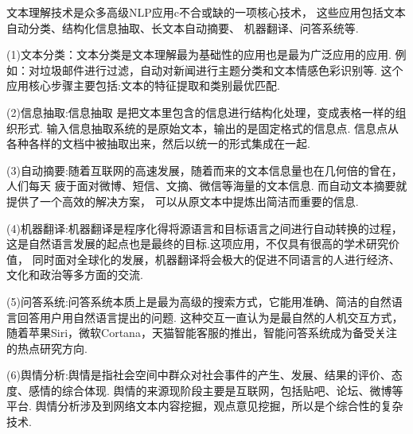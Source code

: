 \documentclass[bachelor,adobefonts]{jnuthesis}
\begin{document}
文本理解技术是众多高级NLP应用c不合或缺的一项核心技术，
这些应用包括文本自动分类、结构化信息抽取、长文本自动摘要、
机器翻译、问答系统等.

(1)文本分类：文本分类是文本理解最为基础性的应用也是最为广泛应用的应用.
例如：对垃圾邮件进行过滤，自动对新闻进行主题分类和文本情感色彩识别等.
这个应用核心步骤主要包括:文本的特征提取和类别最优匹配.

(2)信息抽取:信息抽取 是把文本里包含的信息进行结构化处理，变成表格一样的组织形式.
输入信息抽取系统的是原始文本，输出的是固定格式的信息点.
信息点从各种各样的文档中被抽取出来，然后以统一的形式集成在一起.

(3)自动摘要:随着互联网的高速发展，随着而来的文本信息量也在几何倍的曾在，人们每天
疲于面对微博、短信、文摘、微信等海量的文本信息.
而自动文本摘要就提供了一个高效的解决方案，
可以从原文本中提炼出简洁而重要的信息.

(4)机器翻译:机器翻译是程序化得将源语言和目标语言之间进行自动转换的过程，
这是自然语言发展的起点也是最终的目标.这项应用，不仅具有很高的学术研究价值，
同时面对全球化的发展，机器翻译将会极大的促进不同语言的人进行经济、文化和政治等多方面的交流.

(5)问答系统:问答系统本质上是最为高级的搜索方式，它能用准确、简洁的自然语言回答用户用自然语言提出的问题.
这种交互一直认为是最自然的人机交互方式，随着苹果Siri，微软Cortana，天猫智能客服的推出，智能问答系统成为备受关注的热点研究方向.

(6)舆情分析:舆情是指社会空间中群众对社会事件的产生、发展、结果的评价、态度、感情的综合体现.
舆情的来源现阶段主要是互联网，包括贴吧、论坛、微博等平台.
舆情分析涉及到网络文本内容挖掘，观点意见挖掘，所以是个综合性的复杂技术.
\end{document}
